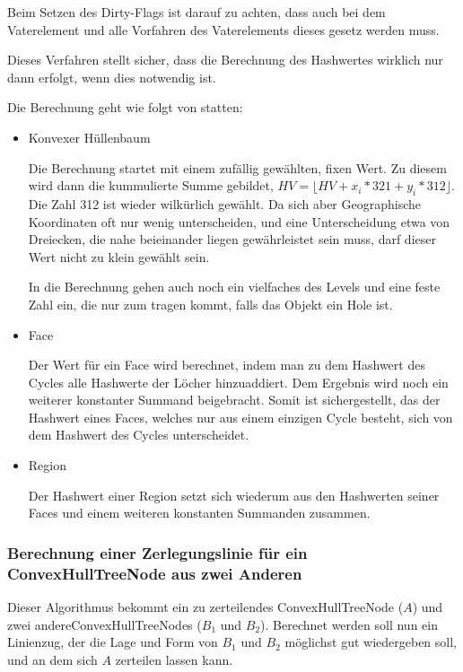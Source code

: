 Beim Setzen des Dirty-Flags ist darauf zu achten, dass auch bei dem Vaterelement und alle Vorfahren des Vaterelements dieses gesetz werden muss.

Dieses Verfahren stellt sicher, dass die Berechnung des Hashwertes wirklich nur dann erfolgt, wenn dies notwendig ist.

Die Berechnung geht wie folgt von statten:

\begin{itemize}
\item Konvexer Hüllenbaum

Die Berechnung startet mit einem zufällig  gewählten, fixen Wert. Zu diesem wird dann die kummulierte Summe gebildet, $HV=\lfloor HV+x_i*321+y_i*312\rfloor$. Die Zahl 312 ist wieder wilkürlich gewählt. Da sich aber Geographische Koordinaten oft nur wenig unterscheiden, und eine Unterscheidung etwa von Dreiecken, die nahe beieinander liegen gewährleistet sein muss, darf dieser Wert nicht zu klein gewählt sein. 

In die Berechnung gehen auch noch ein vielfaches des Levels und eine feste Zahl ein, die nur zum tragen kommt, falls das Objekt ein Hole ist.

\item Face

Der Wert für ein Face wird berechnet, indem man zu dem Hashwert des Cycles alle Hashwerte der Löcher hinzuaddiert. Dem Ergebnis wird noch ein weiterer konstanter Summand beigebracht. Somit ist sichergestellt, das der Hashwert eines Faces, welches nur aus einem einzigen Cycle besteht, sich von dem Hashwert des Cycles unterscheidet.

\item Region

Der Hashwert einer Region setzt sich wiederum aus den Hashwerten seiner Faces und einem weiteren konstanten Summanden zusammen.
\end{itemize}

\subsubsection{Berechnung einer Zerlegungslinie für ein ConvexHullTreeNode aus zwei Anderen}\label{ZerteilungsAlgo}

Dieser Algorithmus bekommt ein zu zerteilendes ConvexHullTreeNode ($A$) und zwei andereConvexHullTreeNodes ($B_1$ und $B_2$). Berechnet werden soll nun ein Linienzug, der die Lage und Form von $B_1$ und $B_2$ möglichst gut wiedergeben soll, und an dem sich $A$ zerteilen lassen kann.

